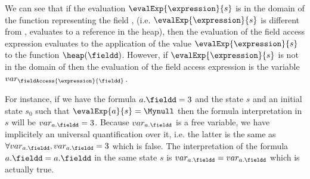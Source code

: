 We can see that if the evaluation $\evalExp{ \expression}{ s } $ is in the domain of the function representing the field \fieldd{},
(i.e.  $\evalExp{ \expression}{ s } $ is different from \Mynull{}, evaluates to a reference in the heap),  
then the evaluation of the field access expression evaluates to the application of the value  $\evalExp{ \expression}{ s } $ to
the function  $\heap(\fieldd)$. However, if  $\evalExp{ \expression}{ s } $ is not in the domain of \fieldd{} then the 
evaluation of the field access expression is  the  variable $var_{\scriptsize{ \fieldAccess{\expression}{\fieldd}}  }$.


For instance, if we have the formula $a.\fieldd = 3$ and the  state $s$ and an initial state $s_0$
 such that $\evalExp{a}{s} = \Mynull$ then the formula interpretation in $ s$  will be 
$var_{\scriptsize{ a.\fieldd}} = 3  $. Because $var_{\scriptsize{ a.\fieldd}} $ is a free variable, we have implicitely an universal
 quantification over it, i.e. the latter is the same as  $   \forall var_{a.\fieldd}, var_{\scriptsize{ a.\fieldd}} = 3 $ which is false.
The interpretation of the formula  $a.\fieldd = a.\fieldd $  in the same state $s$  is 
$var_{\scriptsize{ a.\fieldd}} =var_{\scriptsize{ a.\fieldd}}   $ which is actually true.






